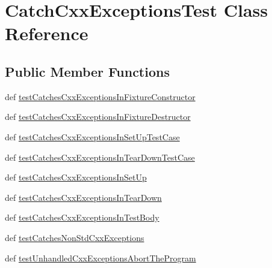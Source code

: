 \hypertarget{classgtest__catch__exceptions__test_1_1CatchCxxExceptionsTest}{\section{\-Catch\-Cxx\-Exceptions\-Test \-Class \-Reference}
\label{d4/d31/classgtest__catch__exceptions__test_1_1CatchCxxExceptionsTest}
}
\subsection*{\-Public \-Member \-Functions}
\begin{DoxyCompactItemize}
\item 
def \hyperlink{classgtest__catch__exceptions__test_1_1CatchCxxExceptionsTest_a5a885e791aafe476fdd5c27e892d03aa}{test\-Catches\-Cxx\-Exceptions\-In\-Fixture\-Constructor}
\item 
def \hyperlink{classgtest__catch__exceptions__test_1_1CatchCxxExceptionsTest_a39d0315d69750ddc3d777d5b554e277d}{test\-Catches\-Cxx\-Exceptions\-In\-Fixture\-Destructor}
\item 
def \hyperlink{classgtest__catch__exceptions__test_1_1CatchCxxExceptionsTest_afd8e6fe37eb76af800212138fd3ffb27}{test\-Catches\-Cxx\-Exceptions\-In\-Set\-Up\-Test\-Case}
\item 
def \hyperlink{classgtest__catch__exceptions__test_1_1CatchCxxExceptionsTest_a2c885c7394e8890932e2946135f2c8a7}{test\-Catches\-Cxx\-Exceptions\-In\-Tear\-Down\-Test\-Case}
\item 
def \hyperlink{classgtest__catch__exceptions__test_1_1CatchCxxExceptionsTest_a244265aa2935ac2803cc16f21ace9d1e}{test\-Catches\-Cxx\-Exceptions\-In\-Set\-Up}
\item 
def \hyperlink{classgtest__catch__exceptions__test_1_1CatchCxxExceptionsTest_a5333d1dbcd9a372f5d61300775bc5305}{test\-Catches\-Cxx\-Exceptions\-In\-Tear\-Down}
\item 
def \hyperlink{classgtest__catch__exceptions__test_1_1CatchCxxExceptionsTest_ab0c384270ee0a7d906d7443378644619}{test\-Catches\-Cxx\-Exceptions\-In\-Test\-Body}
\item 
def \hyperlink{classgtest__catch__exceptions__test_1_1CatchCxxExceptionsTest_a35bedaabb28fea1fd611e99a9a6a14fe}{test\-Catches\-Non\-Std\-Cxx\-Exceptions}
\item 
def \hyperlink{classgtest__catch__exceptions__test_1_1CatchCxxExceptionsTest_a43283026c9019e592f3be2d01f04a492}{test\-Unhandled\-Cxx\-Exceptions\-Abort\-The\-Program}
\end{DoxyCompactItemize}


